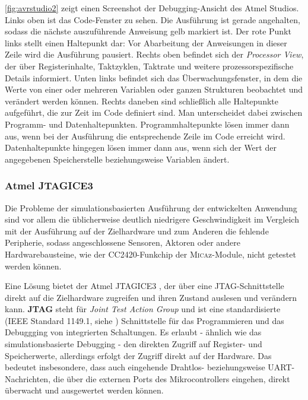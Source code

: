 \autoref{fig:avrstudio2} zeigt einen Screenshot der Debugging-Ansicht des Atmel Studios. Links oben ist das Code-Fenster zu sehen. Die Ausführung ist gerade angehalten, sodass die nächste auszuführende Anweisung gelb markiert ist. Der rote Punkt links stellt einen Haltepunkt dar: Vor Abarbeitung der Anweisungen in dieser Zeile wird die Ausführung pausiert. Rechts oben befindet sich der \textit{Processor View}, der über Registerinhalte, Taktzyklen, Taktrate und weitere prozessorspezifische Details informiert. Unten links befindet sich das Überwachungsfenster, in dem die Werte von einer oder mehreren Variablen oder ganzen Strukturen beobachtet und verändert werden können. Rechts daneben sind schließlich alle Haltepunkte aufgeführt, die zur Zeit im Code definiert sind. Man unterscheidet dabei zwischen Programm- und Datenhaltepunkten. Programmhaltepunkte lösen immer dann aus, wenn bei der Ausführung die entsprechende Zeile im Code erreicht wird. Datenhaltepunkte hingegen lösen immer dann aus, wenn sich der Wert der angegebenen Speicherstelle beziehungsweise Variablen ändert.

\subsubsection{Atmel JTAGICE3}
\label{sec:JTAGICE3}
Die Probleme der simulationsbasierten Ausführung der entwickelten Anwendung sind vor allem die üblicherweise deutlich niedrigere Geschwindigkeit im Vergleich mit der Ausführung auf der Zielhardware und zum Anderen die fehlende Peripherie, sodass angeschlossene Sensoren, Aktoren oder andere Hardwarebausteine, wie der CC2420-Funkchip der \textsc{Mica}z-Module, nicht getestet werden können.

Eine Lösung bietet der Atmel JTAGICE3 \cite{AtmelJTAGICE3:2014:Online}, der über eine JTAG-Schnittstelle direkt auf die Zielhardware zugreifen und ihren Zustand auslesen und verändern kann. \textbf{JTAG} steht für \textit{Joint Test Action Group} und ist eine standardisierte (IEEE Standard 1149.1, siehe \cite{IEEE1149:2014:Online}) Schnittstelle für das Programmieren und das Debuggging von integrierten Schaltungen. Es erlaubt - ähnlich wie das simulationsbasierte Debugging - den direkten Zugriff auf Register- und Speicherwerte, allerdings erfolgt der Zugriff direkt auf der Hardware. Das bedeutet insbesondere, dass auch eingehende Drahtlos- beziehungsweise UART-Nachrichten, die über die externen Ports des Mikrocontrollers eingehen, direkt überwacht und ausgewertet werden können.


